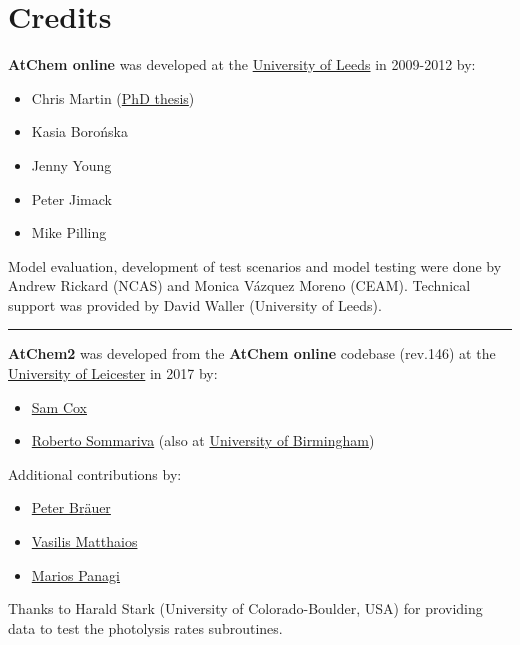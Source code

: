 \section{Credits} \label{sec:credits}

\textbf{AtChem online} was developed at the
\href{https://www.leeds.ac.uk}{University of Leeds} in 2009-2012 by:

\begin{itemize}
\item Chris Martin (\href{http://etheses.whiterose.ac.uk/1596/}{PhD thesis})
\item Kasia Boro{\'n}ska
\item Jenny Young
\item Peter Jimack
\item Mike Pilling
\end{itemize}

Model evaluation, development of test scenarios and model testing were
done by Andrew Rickard (NCAS) and Monica V{\'a}zquez Moreno (CEAM).
Technical support was provided by David Waller (University of Leeds).

\begin{center}\rule{0.5\linewidth}{\linethickness}\end{center}

\textbf{AtChem2} was developed from the \textbf{AtChem online} codebase
(rev.146) at the \href{https://le.ac.uk}{University of Leicester} in
2017 by:

\begin{itemize}
\item \href{https://github.com/spco}{Sam Cox}
\item \href{https://github.com/rs028}{Roberto Sommariva} (also at
  \href{https://www.birmingham.ac.uk}{University of Birmingham})
\end{itemize}

Additional contributions by:

\begin{itemize}
\item \href{https://github.com/pb866}{Peter Br{\"a}uer}
\item \href{https://github.com/kailas29}{Vasilis Matthaios}
\item \href{https://github.com/mpanagi}{Marios Panagi}
\end{itemize}

Thanks to Harald Stark (University of Colorado-Boulder, USA) for
providing data to test the photolysis rates subroutines.


